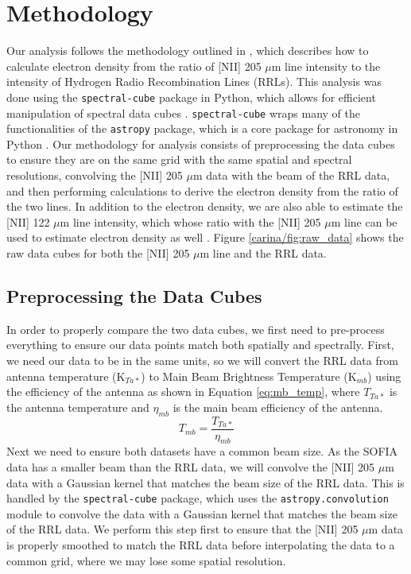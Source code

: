 \section{Methodology}
Our analysis follows the methodology outlined in \cite{pineda2019electron}, which describes how to calculate electron density from the ratio of [NII] 205 $\mu$m line intensity to the intensity of Hydrogen Radio Recombination Lines (RRLs).
This analysis was done using the \texttt{spectral-cube} package in Python, which allows for efficient manipulation of spectral data cubes \parencite{robitaille2016spectral}.
\texttt{spectral-cube} wraps many of the functionalities of the \texttt{astropy} package, which is a core package for astronomy in Python \parencite{astropy:2013, astropy:2018, astropy:2022}.
Our methodology for analysis consists of preprocessing the data cubes to ensure they are on the same grid with the same spatial and spectral resolutions, convolving the [NII] 205 $\mu$m data with the beam of the RRL data, and then performing calculations to derive the electron density from the ratio of the two lines.
In addition to the electron density, we are also able to estimate the [NII] 122 $\mu$m line intensity, which whose ratio with the [NII] 205 $\mu$m line can be used to estimate electron density as well \parencite{goldsmith2015herschel}.
Figure \ref{carina/fig:raw_data} shows the raw data cubes for both the [NII] 205 $\mu$m line and the RRL data.

\subsection{Preprocessing the Data Cubes}
In order to properly compare the two data cubes, we first need to pre-process everything to ensure our data points match both spatially and spectrally.
First, we need our data to be in the same units, so we will convert the RRL data from antenna temperature (K$_{Ta*}$) to Main Beam Brightness Temperature (K$_{mb}$) using the efficiency of the antenna as shown in Equation \ref{eq:mb_temp}, where $T_{Ta*}$ is the antenna temperature and $\eta_{mb}$ is the main beam efficiency of the antenna.
\begin{equation}
    T_{mb} = \frac{T_{Ta*}}{\eta_{mb}}
    \label{eq:mb_temp}
\end{equation}
Next we need to ensure both datasets have a common beam size.
As the SOFIA data has a smaller beam than the RRL data, we will convolve the [NII] 205 $\mu$m data with a Gaussian kernel that matches the beam size of the RRL data.
This is handled by the \texttt{spectral-cube} package, which uses the \texttt{astropy.convolution} module to convolve the data with a Gaussian kernel that matches the beam size of the RRL data.
We perform this step first to ensure that the [NII] 205 $\mu$m data is properly smoothed to match the RRL data before interpolating the data to a common grid, where we may lose some spatial resolution. 

